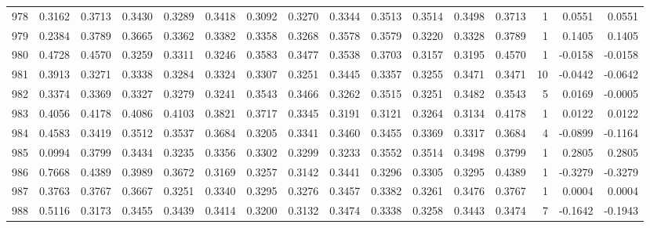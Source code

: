 \begin{tabular}{lrrrrrrrrrrrrrrr}
978 &      0.3162 &  0.3713 &  0.3430 &  0.3289 &  0.3418 &  0.3092 &  0.3270 &  0.3344 &  0.3513 &  0.3514 &   0.3498 &     0.3713 &      1 &                    0.0551 &                     0.0551 \\
979 &      0.2384 &  0.3789 &  0.3665 &  0.3362 &  0.3382 &  0.3358 &  0.3268 &  0.3578 &  0.3579 &  0.3220 &   0.3328 &     0.3789 &      1 &                    0.1405 &                     0.1405 \\
980 &      0.4728 &  0.4570 &  0.3259 &  0.3311 &  0.3246 &  0.3583 &  0.3477 &  0.3538 &  0.3703 &  0.3157 &   0.3195 &     0.4570 &      1 &                   -0.0158 &                    -0.0158 \\
981 &      0.3913 &  0.3271 &  0.3338 &  0.3284 &  0.3324 &  0.3307 &  0.3251 &  0.3445 &  0.3357 &  0.3255 &   0.3471 &     0.3471 &     10 &                   -0.0442 &                    -0.0642 \\
982 &      0.3374 &  0.3369 &  0.3327 &  0.3279 &  0.3241 &  0.3543 &  0.3466 &  0.3262 &  0.3515 &  0.3251 &   0.3482 &     0.3543 &      5 &                    0.0169 &                    -0.0005 \\
983 &      0.4056 &  0.4178 &  0.4086 &  0.4103 &  0.3821 &  0.3717 &  0.3345 &  0.3191 &  0.3121 &  0.3264 &   0.3134 &     0.4178 &      1 &                    0.0122 &                     0.0122 \\
984 &      0.4583 &  0.3419 &  0.3512 &  0.3537 &  0.3684 &  0.3205 &  0.3341 &  0.3460 &  0.3455 &  0.3369 &   0.3317 &     0.3684 &      4 &                   -0.0899 &                    -0.1164 \\
985 &      0.0994 &  0.3799 &  0.3434 &  0.3235 &  0.3356 &  0.3302 &  0.3299 &  0.3233 &  0.3552 &  0.3514 &   0.3498 &     0.3799 &      1 &                    0.2805 &                     0.2805 \\
986 &      0.7668 &  0.4389 &  0.3989 &  0.3672 &  0.3169 &  0.3257 &  0.3142 &  0.3441 &  0.3296 &  0.3305 &   0.3295 &     0.4389 &      1 &                   -0.3279 &                    -0.3279 \\
987 &      0.3763 &  0.3767 &  0.3667 &  0.3251 &  0.3340 &  0.3295 &  0.3276 &  0.3457 &  0.3382 &  0.3261 &   0.3476 &     0.3767 &      1 &                    0.0004 &                     0.0004 \\
988 &      0.5116 &  0.3173 &  0.3455 &  0.3439 &  0.3414 &  0.3200 &  0.3132 &  0.3474 &  0.3338 &  0.3258 &   0.3443 &     0.3474 &      7 &                   -0.1642 &                    -0.1943 \\

\end{tabular}

